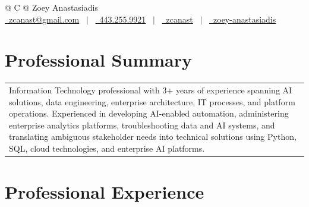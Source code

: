 \documentclass[a4paper,10pt]{article}
\begin{document}
\pagestyle{empty}


\begin{tabularx}{\linewidth}{@{} C @{}}
\Huge{Zoey Anastasiadis} \\[7.0pt]

\href{mailto:zcanast@gmail.com}
{\raisebox{-0.05\height}\faEnvelope\ zcanast@gmail.com}
\ $|$ \ 
\href{tel:+4432559921}
{\raisebox{-0.05\height}\faMobile\ 443.255.9921}
\ $|$ \ 
\href{https://github.com/zcanast}
{\raisebox{-0.05\height}\faGithub\ zcanast}
\ $|$ \ 
\href{https://linkedin.com/in/zoey-anastasiadis}
{\raisebox{-0.05\height}\faLinkedin\ zoey-anastasiadis}
\\
\end{tabularx}


\section{Professional Summary}

\begin{tabularx}{\linewidth}{@{}X@{}}
Information Technology professional with 3+ years of experience spanning AI solutions, data engineering, enterprise architecture, IT processes, and platform operations. Experienced in developing AI-enabled automation, administering enterprise analytics platforms, troubleshooting data and AI systems, and translating ambiguous stakeholder needs into technical solutions using Python, SQL, cloud technologies, and enterprise AI platforms.
\end{tabularx}


\section{Professional Experience}
\end{document}
